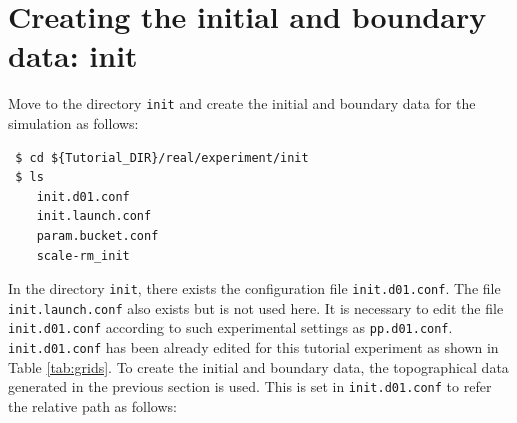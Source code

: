 \section{Creating the initial and boundary data: init} \label{sec:tutrial_real_init}

Move to the directory \verb|init| and create the initial and boundary data for the \scalerm simulation as follows:
\begin{verbatim}
 $ cd ${Tutorial_DIR}/real/experiment/init
 $ ls
    init.d01.conf
    init.launch.conf
    param.bucket.conf
    scale-rm_init
\end{verbatim}

In the directory \verb|init|, there exists the configuration file \verb|init.d01.conf|.
The file \verb|init.launch.conf| also exists but is not used here.
It is necessary to edit the file \verb|init.d01.conf| according to such experimental settings as \verb|pp.d01.conf|. \verb|init.d01.conf| has been already edited for this tutorial experiment as shown in Table \ref{tab:grids}.  To create the initial and boundary data,  the topographical data generated in the previous section is used. This is set in \verb|init.d01.conf| to refer the relative path as follows:

